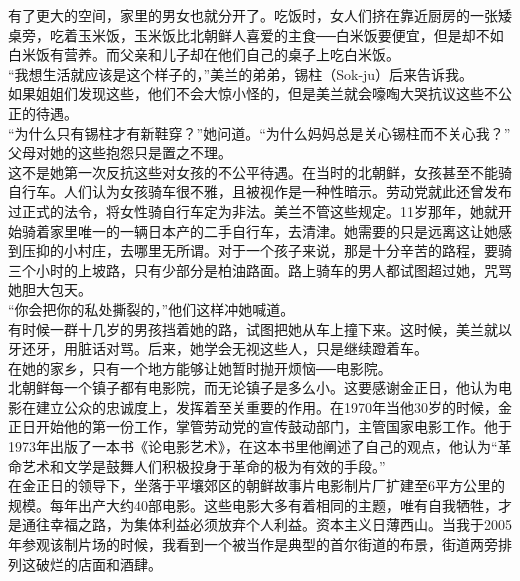 有了更大的空间，家里的男女也就分开了。吃饭时，女人们挤在靠近厨房的一张矮桌旁，吃着玉米饭，玉米饭比北朝鲜人喜爱的主食──白米饭要便宜，但是却不如白米饭有营养。而父亲和儿子却在他们自己的桌子上吃白米饭。\\

“我想生活就应该是这个样子的，”美兰的弟弟，锡柱（Sok-ju）后来告诉我。\\

如果姐姐们发现这些，他们不会大惊小怪的，但是美兰就会嚎啕大哭抗议这些不公正的待遇。\\

“为什么只有锡柱才有新鞋穿？”她问道。“为什么妈妈总是关心锡柱而不关心我？”\\

父母对她的这些抱怨只是置之不理。\\

这不是她第一次反抗这些对女孩的不公平待遇。在当时的北朝鲜，女孩甚至不能骑自行车。人们认为女孩骑车很不雅，且被视作是一种性暗示。劳动党就此还曾发布过正式的法令，将女性骑自行车定为非法。美兰不管这些规定。11岁那年，她就开始骑着家里唯一的一辆日本产的二手自行车，去清津。她需要的只是远离这让她感到压抑的小村庄，去哪里无所谓。对于一个孩子来说，那是十分辛苦的路程，要骑三个小时的上坡路，只有少部分是柏油路面。路上骑车的男人都试图超过她，咒骂她胆大包天。\\

“你会把你的私处撕裂的，”他们这样冲她喊道。\\

有时候一群十几岁的男孩挡着她的路，试图把她从车上撞下来。这时候，美兰就以牙还牙，用脏话对骂。后来，她学会无视这些人，只是继续蹬着车。\\

在她的家乡，只有一个地方能够让她暂时抛开烦恼──电影院。\\

北朝鲜每一个镇子都有电影院，而无论镇子是多么小。这要感谢金正日，他认为电影在建立公众的忠诚度上，发挥着至关重要的作用。在1970年当他30岁的时候，金正日开始他的第一份工作，掌管劳动党的宣传鼓动部门，主管国家电影工作。他于1973年出版了一本书《论电影艺术》，在这本书里他阐述了自己的观点，他认为“革命艺术和文学是鼓舞人们积极投身于革命的极为有效的手段。”\\

在金正日的领导下，坐落于平壤郊区的朝鲜故事片电影制片厂扩建至6平方公里的规模。每年出产大约40部电影。这些电影大多有着相同的主题，唯有自我牺牲，才是通往幸福之路，为集体利益必须放弃个人利益。资本主义日薄西山。当我于2005年参观该制片场的时候，我看到一个被当作是典型的首尔街道的布景，街道两旁排列这破烂的店面和酒肆。\\

